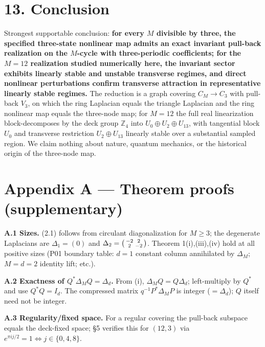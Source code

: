 \documentclass[
  11pt,
  a4paper,
]{article}
\begin{document}
\section{13. Conclusion}\label{conclusion}

Strongest supportable conclusion: \textbf{for every \(M\) divisible by three, the specified three-state nonlinear map admits an exact invariant pull-back realization on the \(M\)-cycle with three-periodic coefficients; for the \(M=12\) realization studied numerically here, the invariant sector exhibits linearly stable and unstable transverse regimes, and direct nonlinear perturbations confirm transverse attraction in representative linearly stable regimes.} The reduction is a graph covering \(C_M\xrightarrow{}C_3\) with pull-back \(V_3\), on which the ring Laplacian equals the triangle Laplacian and the ring nonlinear map equals the three-node map; for \(M=12\) the full real linearization block-decomposes by the deck group \(\mathbb Z_4\) into \(U_0\oplus U_2\oplus U_{13}\), with tangential block \(U_0\) and transverse restriction \(U_2\oplus U_{13}\) linearly stable over a substantial sampled region. We claim nothing about nature, quantum mechanics, or the historical origin of the three-node map.

\clearpage

\section{Appendix A --- Theorem proofs (supplementary)}\label{appendix-a-theorem-proofs-supplementary}

\textbf{A.1 Sizes.} (2.1) follows from circulant diagonalization for \(M\ge3\); the degenerate Laplacians are \(\Delta_1=(0)\) and \(\Delta_2=\begin{psmallmatrix}-2&2\\2&-2\end{psmallmatrix}\). Theorem 1(i),(iii),(iv) hold at all positive sizes (P01 boundary table: \(d=1\) constant column annihilated by \(\Delta_M\); \(M=d=2\) identity lift; etc.).

\textbf{A.2 Exactness of \(Q^\ast\Delta_M Q=\Delta_d\).} From (i), \(\Delta_M Q=Q\Delta_d\); left-multiply by \(Q^\ast\) and use \(Q^\ast Q=I_d\). The compressed matrix \(q^{-1}P^\ast\Delta_M P\) is integer (\(=\Delta_d\)); \(Q\) itself need not be integer.

\textbf{A.3 Regularity/fixed space.} For a regular covering the pull-back subspace equals the deck-fixed space; §5 verifies this for \((12,3)\) via \(e^{\pi ij/2}=1\iff j\in\{0,4,8\}\).
\end{document}

